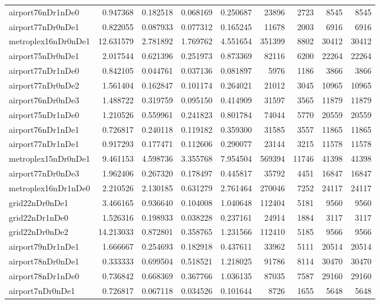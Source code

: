 \documentclass[../../../thesis.tex]{subfiles}
\begin{document}
\begin{longtable}{|l|r|r|r|r|r|r|r|r|}
airport76nDr1nDe0 & 0.947368 & 0.182518 & 0.068169 & 0.250687 & 23896 & 2723 & 8545 & 8545 \\
airport77nDr0nDe1 & 0.822055 & 0.087933 & 0.077312 & 0.165245 & 11678 & 2003 & 6916 & 6916 \\
metroplex16nDr0nDe1 & 12.631579 & 2.781892 & 1.769762 & 4.551654 & 351399 & 8802 & 30412 & 30412 \\
airport75nDr0nDe1 & 2.017544 & 0.621396 & 0.251973 & 0.873369 & 82116 & 6200 & 22264 & 22264 \\
airport77nDr1nDe0 & 0.842105 & 0.044761 & 0.037136 & 0.081897 & 5976 & 1186 & 3866 & 3866 \\
airport77nDr0nDe2 & 1.561404 & 0.162847 & 0.101174 & 0.264021 & 21012 & 3045 & 10965 & 10965 \\
airport76nDr0nDe3 & 1.488722 & 0.319759 & 0.095150 & 0.414909 & 31597 & 3565 & 11879 & 11879 \\
airport75nDr1nDe0 & 1.210526 & 0.559961 & 0.241823 & 0.801784 & 74044 & 5770 & 20559 & 20559 \\
airport76nDr1nDe1 & 0.726817 & 0.240118 & 0.119182 & 0.359300 & 31585 & 3557 & 11865 & 11865 \\
airport77nDr1nDe1 & 0.917293 & 0.177471 & 0.112606 & 0.290077 & 23144 & 3215 & 11578 & 11578 \\
metroplex15nDr0nDe1 & 9.461153 & 4.598736 & 3.355768 & 7.954504 & 569394 & 11746 & 41398 & 41398 \\
airport77nDr0nDe3 & 1.962406 & 0.267320 & 0.178497 & 0.445817 & 35792 & 4451 & 16847 & 16847 \\
metroplex16nDr1nDe0 & 2.210526 & 2.130185 & 0.631279 & 2.761464 & 270046 & 7252 & 24117 & 24117 \\
grid22nDr0nDe1 & 3.466165 & 0.936640 & 0.104008 & 1.040648 & 112404 & 5181 & 9560 & 9560 \\
grid22nDr1nDe0 & 1.526316 & 0.198933 & 0.038228 & 0.237161 & 24914 & 1884 & 3117 & 3117 \\
grid22nDr0nDe2 & 14.213033 & 0.872801 & 0.358765 & 1.231566 & 112410 & 5185 & 9566 & 9566 \\
airport79nDr1nDe1 & 1.666667 & 0.254693 & 0.182918 & 0.437611 & 33962 & 5111 & 20514 & 20514 \\
airport78nDr0nDe1 & 0.333333 & 0.699504 & 0.518521 & 1.218025 & 91786 & 8114 & 30470 & 30470 \\
airport78nDr1nDe0 & 0.736842 & 0.668369 & 0.367766 & 1.036135 & 87035 & 7587 & 29160 & 29160 \\
airport7nDr0nDe1 & 0.726817 & 0.067118 & 0.034526 & 0.101644 & 8726 & 1655 & 5648 & 5648 \\

\end{longtable}
\end{document}
